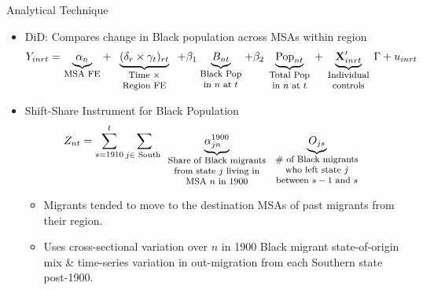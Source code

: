 \documentclass[11pt, aspectratio=169]{beamer}
\begin{document}
\begin{frame}{Analytical Technique}

\begin{itemize}
    \item DiD: Compares change in Black population across MSAs within region
        \vspace{-0.2cm} %
        \begin{align}
            Y_{i n r t}=\underbrace{\alpha_n}_{\parbox[t]{1.2cm}{\raggedright \footnotesize \centering MSA FE}}
            +\underbrace{(\delta_r \times \gamma_t)_{r t}}_{\parbox[t]{2cm}{\raggedright \footnotesize \centering Time $\times$ Region FE}}
            +\beta_1 \underbrace{B_{n t}}_{\parbox[t]{1.4cm}{\raggedright \footnotesize \centering Black Pop in $n$ at $t$}}
            +\beta_2 \underbrace{\operatorname{Pop}_{n t}}_{\parbox[t]{1.5cm}{\raggedright \footnotesize \centering Total Pop in $n$ at $t$}}
            +\underbrace{\mathbf{X}_{i n r t}^{\prime}}_{\parbox[t]{1.5cm}{\raggedright \footnotesize \centering Individual controls}} \Gamma
            +u_{i n r t}
        \end{align}
        \vspace{-1cm} %
    \item Shift-Share Instrument for Black Population
        \vspace{-0.2cm} %
        \begin{align}
            Z_{n t}=\sum_{s=1910}^t \sum_{j \in \text { South }} \underbrace{\alpha_{j n}^{1900}}_{\parbox[t]{3.3cm}{\raggedright \footnotesize \centering Share of Black migrants from state $j$ living in MSA $n$ in 1900}} \underbrace{O_{j s}}_{\parbox[t]{3cm}{\raggedright \footnotesize \centering \# of Black migrants who left state $j$ between $s-1$ and $s$}}
        \end{align}
        \vspace{-0.6cm} %
        \begin{itemize}
            \item Migrants tended to move to the destination MSAs of past migrants from their region.
            \item Uses cross-sectional variation over $n$ in 1900 Black migrant state-of-origin mix \& time-series variation in out-migration from each Southern state post-1900.
        \end{itemize}
\end{itemize}

\end{frame}
\end{document}

